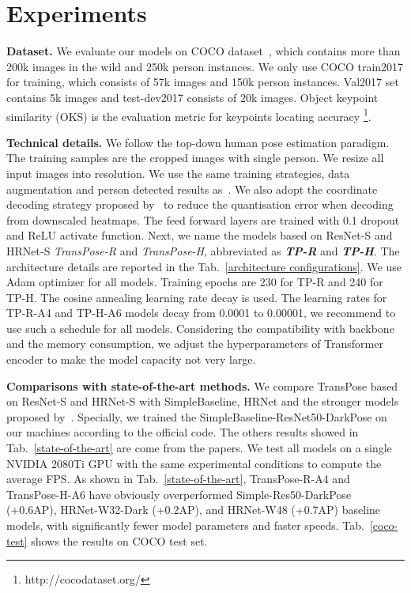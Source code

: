 \documentclass{article}
\begin{document}
\section{Experiments} 


{\bf Dataset.} We evaluate our models on COCO dataset~\cite{lin2014microsoft}, which contains more than 200k images in the wild and 250k person instances. We only use COCO train2017 for training, which consists of 57k images and 150k person instances. Val2017 set contains 5k images and test-dev2017 consists of 20k images. Object keypoint similarity (OKS) is the evaluation metric for keypoints locating accuracy \footnote{http://cocodataset.org/}.  



{\bf Technical details.} We follow the top-down human pose estimation paradigm. The training samples are the cropped images with single person. We resize all input images into  resolution. We use the same training strategies, data augmentation and person detected results as~\cite{sun2019hrnet}. We also adopt the coordinate decoding strategy proposed by~\cite{zhang2020distribution} to reduce the quantisation error when decoding from downscaled heatmaps. The feed forward layers are trained with 0.1 dropout and ReLU activate function. Next, we name the models based on ResNet-S and HRNet-S \emph{TransPose-R} and \emph{TransPose-H}, abbreviated as \emph{\textbf{TP-R}} and \emph{\textbf{TP-H}}. The architecture details are reported in the Tab.~\ref{architecture configurations}. We use Adam optimizer for all models. Training epochs are 230 for TP-R and 240 for TP-H. The cosine annealing learning rate decay is used. The learning rates for TP-R-A4 and TP-H-A6 models decay from 0.0001 to 0.00001, we recommend to use such a schedule for all models. Considering the compatibility with backbone and the memory consumption, we adjust the hyperparameters of Transformer encoder to make the model capacity not very large. 

{\bf Comparisons with state-of-the-art methods.} We compare TransPose based on ResNet-S and HRNet-S with SimpleBaseline, HRNet and the stronger models proposed by~\cite{zhang2020distribution}. Specially, we trained the SimpleBaseline-ResNet50-DarkPose on our machines according to the official code. The others results showed in Tab.~\ref{state-of-the-art} are come from the papers. We test all models on a single NVIDIA 2080Ti GPU with the same experimental conditions to compute the average FPS. As shown in Tab.~\ref{state-of-the-art}, TransPose-R-A4 and TransPose-H-A6 have obviously overperformed Simple-Res50-DarkPose (+0.6AP), HRNet-W32-Dark (+0.2AP), and HRNet-W48 (+0.7AP) baseline models, with significantly fewer model parameters and faster speeds. Tab.~\ref{coco-test} shows the results on COCO test set.
\end{document}
